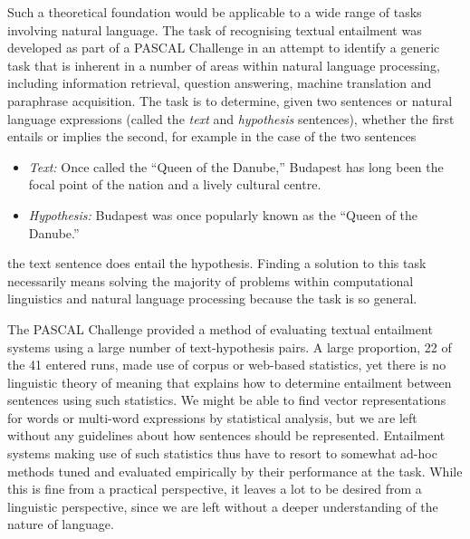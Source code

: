 Such a theoretical foundation would be applicable to a wide range of tasks involving natural language. The task of recognising textual entailment was developed as part of a PASCAL Challenge  \citep{Dagan:05,Bar-Haim:06} in an attempt to identify a generic task that is inherent in a number of areas within natural language processing, including information retrieval, question answering, machine translation and paraphrase acquisition. The task is to determine, given two sentences or natural language expressions (called the \emph{text} and \emph{hypothesis} sentences), whether the first entails or implies the second, for example in the case of the two sentences
\begin{itemize}
\item \emph{Text:} Once called the ``Queen of the Danube,'' Budapest has long been the focal point of the nation and a lively cultural centre.
\item \emph{Hypothesis:} Budapest was once popularly known as the ``Queen of the Danube.''
\end{itemize}
the text sentence does entail the hypothesis. Finding a solution to this task necessarily means solving the majority of problems within computational linguistics and natural language processing because the task is so general.

The PASCAL Challenge provided a method of evaluating textual entailment systems using a large number of text-hypothesis pairs. A large proportion, 22 of the 41 entered runs, made use of corpus or web-based statistics, yet there is no linguistic theory of meaning that explains how to determine entailment between sentences using such statistics. We might be able to find vector representations for words or multi-word expressions by statistical analysis, but we are left without any guidelines about how sentences should be represented. Entailment systems making use of such statistics thus have to resort to somewhat ad-hoc methods tuned and evaluated empirically by their performance at the task. While this is fine from a practical perspective, it leaves a lot to be desired from a linguistic perspective, since we are left without a deeper understanding of the nature of language.

